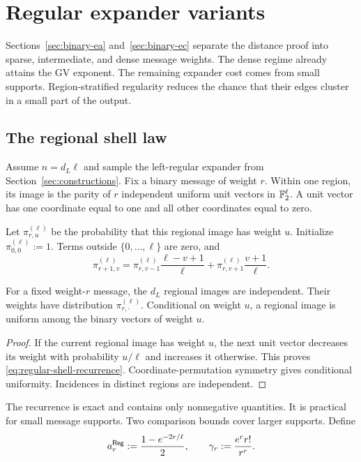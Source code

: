 \section{Regular expander variants}
\label{sec:regular}

Sections~\ref{sec:binary-ea} and~\ref{sec:binary-ec} separate the distance
proof into sparse, intermediate, and dense message weights.  The dense regime
already attains the GV exponent.  The remaining expander cost comes from small
supports.  Region-stratified regularity reduces the chance that their edges
cluster in a small part of the output.

\subsection{The regional shell law}

Assume $n=d_L\ell$ and sample the left-regular expander from
Section~\ref{sec:constructions}.  Fix a binary message of weight $r$.  Within
one region, its image is the parity of $r$ independent uniform unit vectors in
$\mathbb F_2^\ell$.  A unit vector has one coordinate equal to one and all other
coordinates equal to zero.

Let $\pi^{(\ell)}_{r,u}$ be the probability that this regional image has
weight $u$.  Initialize $\pi^{(\ell)}_{0,0}:=1$.  Terms outside
$\{0,\ldots,\ell\}$ are zero, and
\begin{equation}
 \pi^{(\ell)}_{r+1,v}=
 \pi^{(\ell)}_{r,v-1}\frac{\ell-v+1}{\ell}
 +\pi^{(\ell)}_{r,v+1}\frac{v+1}{\ell}.
 \label{eq:regular-shell-recurrence}
\end{equation}

\begin{lemma}
\label{lem:regular-shell-law}
For a fixed weight-$r$ message, the $d_L$ regional images are independent.
Their weights have distribution $\pi^{(\ell)}_{r,\cdot}$.  Conditional on
weight $u$, a regional image is uniform among the binary vectors of weight
$u$.
\end{lemma}

\begin{proof}
If the current regional image has weight $u$, the next unit vector decreases
its weight with probability $u/\ell$ and increases it otherwise.  This proves
\eqref{eq:regular-shell-recurrence}.  Coordinate-permutation symmetry gives
conditional uniformity.  Incidences in distinct regions are independent.
\end{proof}

The recurrence is exact and contains only nonnegative quantities.  It is
practical for small message supports.  Two comparison bounds cover larger
supports.  Define
\begin{equation}
 a^{\mathsf{Reg}}_r:=\frac{1-e^{-2r/\ell}}2,
 \qquad
 \gamma_r:=\frac{e^r r!}{r^r}.
 \label{eq:regular-poisson-parameters}
\end{equation}

